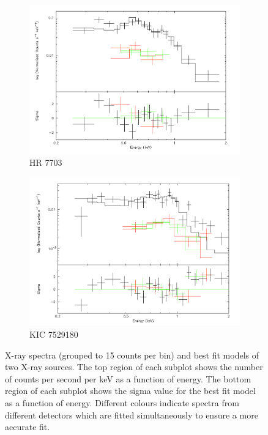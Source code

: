 \begin{appendices}
\begin{figure}
\begin{subfigure}{\textwidth}
	\centering
	\includegraphics[height = 0.25\paperheight,width=\textwidth]{Figures/3-Xray_age/spec_hr7703}
	\caption{HR 7703}
\end{subfigure}
\begin{subfigure}{\textwidth}
	\centering
	\includegraphics[height = 0.25\paperheight,width=\textwidth]{Figures/3-Xray_age/spec_kic7529180}
	\caption{KIC 7529180}
\end{subfigure}

\caption[X-ray spectra of HR 7703 and KIC 7529180]{X-ray spectra (grouped to 15 counts per bin) and best fit models of two X-ray sources. The top region of each subplot shows the number of counts per second per keV as a function of energy. The bottom region of each subplot shows the sigma value for the best fit model as a function of energy. Different colours indicate spectra from different detectors which are fitted simultaneously to ensure a more accurate fit.}
\label{App_A_HR7703_KIC7529180}
\end{figure}


\end{appendices}
